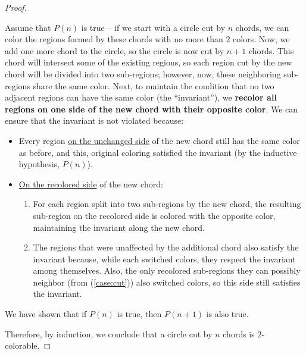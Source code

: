 \documentclass{theoremnote}
\begin{document}
\begin{ProofSolution}
\begin{proof}
\begin{induction}
{      Assume that $P(n)$ is true -- if we start with a circle cut by $n$ chords, we can color the regions formed by these chords with no more than $2$ colors.
      Now, we add one more chord to the circle, so the circle is now cut by $n + 1$ chords. This chord will intersect some of the existing regions, so each region cut by the new chord will be divided into two sub-regions; however, now, these neighboring sub-regions share the same color.
      Next, to maintain the condition that no two adjacent regions can have the same color (the ``invariant''), we \textbf{recolor all regions on one side of the new chord with their opposite color}. 
      We can ensure that the invariant is not violated because:
      \begin{itemize}
        \item Every region \underline{on the unchanged side} of the new chord still has the same color as before, and this, original coloring satisfied the invariant (by the inductive hypothesis, $P(n)$).
        \item \underline{On the recolored side} of the new chord: 
        \begin{enumerate}
          \item \label{case:cut} For each region split into two sub-regions by the new chord, the resulting sub-region on the recolored side is colored with the opposite color, maintaining the invariant along the new chord. 
          \item The regions that were unaffected by the additional chord also satisfy the invariant because, while each switched colors, they respect the invariant among themselves. Also, the only recolored sub-regions they can possibly neighbor (from (\ref{case:cut})) also switched colors, so this side still satisfies the invariant. 
        \end{enumerate}
      \end{itemize}
    }
    We have shown that if $P(n)$ is true, then $P(n+1)$ is also true.
    \end{induction}

    Therefore, by induction, we conclude that a circle cut by $n$ chords is $2$-colorable.
  \end{proof}

\end{ProofSolution}
\end{document}
